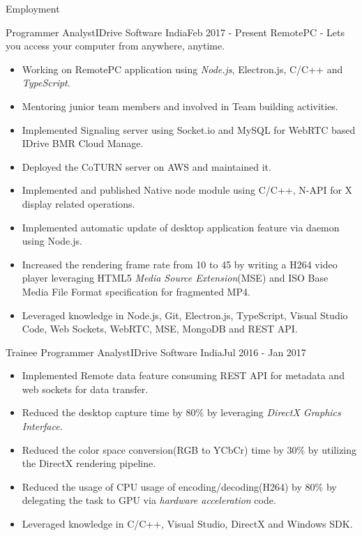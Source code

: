 \documentclass[]{mcdowellcv}
\begin{document}
	\begin{cvsection}{Employment}
		\begin{cvsubsection}{Programmer Analyst}{IDrive Software India}{Feb 2017 - Present}
			RemotePC - Lets you access your computer from anywhere, anytime.
			\begin{itemize}
				\item Working on RemotePC application using \textit{Node.js}, Electron.js, C/C++ and \textit{TypeScript}.
				\item Mentoring junior team members and involved in Team building activities.
				\item Implemented Signaling server using Socket.io and MySQL for WebRTC based IDrive BMR Cloud Manage.
				\item Deployed the CoTURN server on AWS and maintained it.
				\item Implemented and published Native node module using C/C++, N-API for X display related operations.
				\item Implemented automatic update of desktop application feature via daemon using Node.js.
				\item Increased the rendering frame rate from 10 to 45 by writing a H264 video player leveraging HTML5 \textit{Media Source Extension}(MSE) and ISO Base Media File Format specification for fragmented MP4.
				\item Leveraged knowledge in Node.js, Git, Electron.js, TypeScript, Visual Studio Code, Web Sockets, WebRTC, MSE, MongoDB and REST API.
			\end{itemize}
		\end{cvsubsection}
		
		\begin{cvsubsection}{Trainee Programmer Analyst}{IDrive Software India}{Jul 2016 - Jan 2017}
			\begin{itemize}
			\item Implemented Remote data feature consuming REST API for metadata and web sockets for data transfer.
				\item Reduced the desktop capture time by 80\% by leveraging \textit{DirectX Graphics Interface}.
				\item Reduced the color space conversion(RGB to YCbCr) time by 30\% by utilizing the DirectX rendering pipeline.
				\item Reduced the usage of CPU usage of encoding/decoding(H264) by 80\% by delegating the task to GPU via \textit{hardware acceleration} code.
				\item Leveraged knowledge in C/C++, Visual Studio, DirectX and Windows SDK.
			\end{itemize}
		\end{cvsubsection}
		

\end{cvsection}
\end{document}
